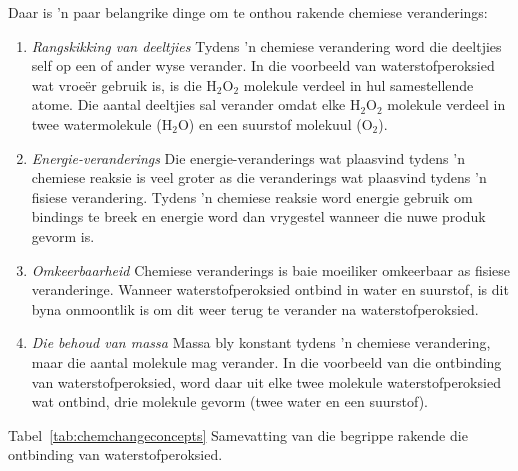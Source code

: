       \label{m38709*id62865} Daar is 'n paar belangrike dinge om te onthou rakende chemiese veranderings:\par 
      \label{m38709*id62869}\begin{enumerate}[noitemsep, label=\textbf{\arabic*}. ] 
            \label{m38709*uid6}\item \textsl{Rangskikking van deeltjies}\newline
Tydens 'n chemiese verandering word die deeltjies self op een of ander wyse verander. In die voorbeeld van waterstofperoksied wat vroe\"{e}r gebruik is, is die $\text{H}_{2}\text{O}_{2}$ molekule verdeel in hul samestellende atome. Die aantal deeltjies sal verander omdat elke $\text{H}_{2}\text{O}_{2}$ molekule verdeel in twee watermolekule ($\text{H}_{2}\text{O}$) en een suurstof molekuul ($\text{O}_{2}$).
\label{m38709*uid7}\item \textsl{Energie-veranderings}\newline
Die energie-veranderings wat plaasvind tydens 'n chemiese reaksie is veel groter as die veranderings wat plaasvind tydens 'n fisiese verandering. Tydens 'n chemiese reaksie word energie gebruik om bindings te breek en energie word dan vrygestel wanneer die nuwe produk gevorm is. 
\label{m38709*uid8}\item \textsl{Omkeerbaarheid}\newline
Chemiese veranderings is baie moeiliker omkeerbaar as fisiese veranderinge. Wanneer waterstofperoksied ontbind in water en suurstof, is dit byna onmoontlik is om dit weer terug te verander na waterstofperoksied.
\item \textsl{Die behoud van massa}\newline
Massa bly konstant tydens 'n chemiese verandering, maar die aantal molekule mag verander. In die voorbeeld van die ontbinding van waterstofperoksied, word daar uit elke twee molekule waterstofperoksied wat ontbind, drie molekule gevorm (twee water en een suurstof).
\end{enumerate}
Tabel~\ref{tab:chemchangeconcepts} Samevatting van die begrippe rakende die ontbinding van waterstofperoksied.
